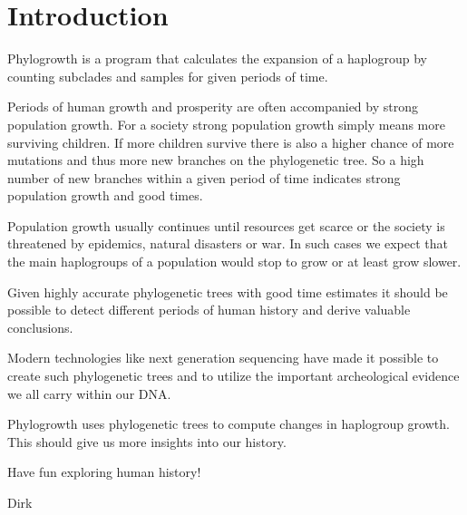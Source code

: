 \section{Introduction}

Phylogrowth is a program that calculates the expansion of
a haplogroup by counting subclades and samples for given
periods of time.

Periods of human growth and prosperity are often accompanied
by strong population growth. For a society strong population
growth simply means more surviving children. If more children
survive there is also a higher chance of more mutations and
thus more new branches on the phylogenetic tree. So a high
number of new branches within a given period of time indicates
strong population growth and good times.

Population growth usually continues until resources get scarce
or the society is threatened by epidemics, natural disasters or
war. In such cases we expect that the main haplogroups of a
population would stop to grow or at least grow slower.

Given highly accurate phylogenetic trees with good time estimates
it should be possible to detect different periods of human history
and derive valuable conclusions.

Modern technologies like next generation sequencing have made
it possible to create such phylogenetic trees and to utilize
the important archeological evidence we all carry within our
DNA.

Phylogrowth uses phylogenetic trees to compute changes in
haplogroup growth. This should give us more insights into
our history.

\vspace{1em}\noindent
Have fun exploring human history!

\vspace{1em} Dirk



